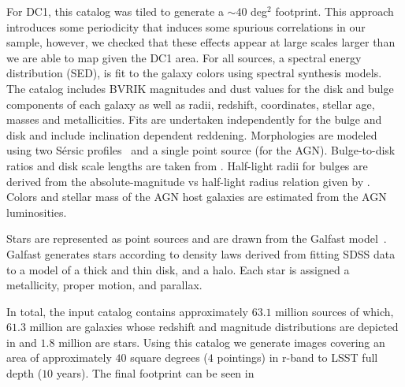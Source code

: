 \documentclass[\docopts]{\docclass}
\begin{document}
For DC1, this catalog was tiled to generate a $\sim 40$ deg$^{2}$ footprint. This approach introduces some periodicity that induces some spurious correlations in our sample, however, we checked that these effects appear at large scales larger than we are able to map given the DC1 area. For all sources, a spectral energy distribution (SED), is fit to the galaxy colors using \citet{2003MNRAS.344.1000B} spectral synthesis models. The \citet{2006MNRAS.366..499D} catalog includes BVRIK magnitudes and dust values for the disk and bulge components of each galaxy as well as radii, redshift, coordinates, stellar age, masses and metallicities. Fits are undertaken independently for the bulge and disk and include inclination dependent reddening. Morphologies are modeled using two S\'{e}rsic profiles~\citep{1963BAAA....6...41S} and a single point source (for the AGN). Bulge-to-disk ratios and disk scale lengths are taken from \citep{2006MNRAS.366..499D}. Half-light radii for bulges are derived from the absolute-magnitude vs half-light radius relation given by \citet{2011A&A...534A...3G}. Colors and stellar mass of the AGN host galaxies are estimated from the AGN luminosities. 

Stars are represented as point sources and are drawn from the Galfast model~\citep{2008ApJ...673..864J}. Galfast generates stars according to density laws derived from fitting SDSS data to a model of a thick and thin disk, and a halo. Each star is assigned a metallicity, proper motion, and parallax. 

In total, the input catalog contains approximately $63.1$ million sources of which, $61.3$ million are galaxies whose redshift and magnitude distributions are depicted in  and $1.8$ million are stars. Using this catalog we generate images covering an area of approximately $40$ square degrees ($4$ pointings) in r-band to LSST full depth ($10$ years). The final footprint can be seen in 
\end{document}
